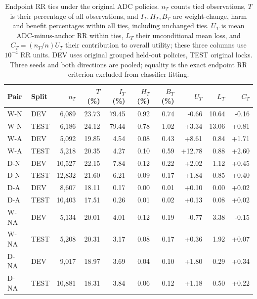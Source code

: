 \begin{table}[htbp]
\centering\footnotesize\setlength{\tabcolsep}{3pt}
\caption{Endpoint RR ties under the original ADC policies. $n_T$ counts tied observations, $T$ is their percentage of all observations, and $I_T,H_T,B_T$ are weight-change, harm and benefit percentages within all ties, including unchanged ties. $U_T$ is mean ADC-minus-anchor RR within ties, $L_T$ their unconditional mean loss, and $C_T=(n_T/n)U_T$ their contribution to overall utility; these three columns use $10^{-4}$ RR units. DEV uses original grouped held-out policies, TEST original locks. Three seeds and both directions are pooled; equality is the exact endpoint RR criterion excluded from classifier fitting.}
\label{tab:ties-pooled}
\begin{tabular}{llrrrrrrrr}
\toprule
Pair & Split & $n_T$ & $T$ (\%) & $I_T$ (\%) & $H_T$ (\%) & $B_T$ (\%) & $U_T$ & $L_T$ & $C_T$\\
\midrule
W-N & DEV & 6,089 & 23.73 & 79.45 & 0.92 & 0.74 & -0.66 & 10.64 & -0.16\\
W-N & TEST & 6,186 & 24.12 & 79.44 & 0.78 & 1.02 & +3.34 & 13.06 & +0.81\\
W-A & DEV & 5,092 & 19.85 & 4.54 & 0.08 & 0.43 & +8.61 & 0.84 & +1.71\\
W-A & TEST & 5,218 & 20.35 & 4.27 & 0.10 & 0.59 & +12.78 & 0.88 & +2.60\\
D-N & DEV & 10,527 & 22.15 & 7.84 & 0.12 & 0.22 & +2.02 & 1.12 & +0.45\\
D-N & TEST & 12,832 & 21.60 & 6.21 & 0.09 & 0.17 & +1.84 & 0.85 & +0.40\\
D-A & DEV & 8,607 & 18.11 & 0.17 & 0.00 & 0.01 & +0.10 & 0.00 & +0.02\\
D-A & TEST & 10,403 & 17.51 & 0.26 & 0.01 & 0.02 & +0.13 & 0.08 & +0.02\\
W-NA & DEV & 5,134 & 20.01 & 4.01 & 0.12 & 0.19 & -0.77 & 3.38 & -0.15\\
W-NA & TEST & 5,208 & 20.31 & 3.17 & 0.08 & 0.17 & +0.36 & 1.92 & +0.07\\
D-NA & DEV & 9,017 & 18.97 & 3.69 & 0.04 & 0.10 & +1.80 & 0.29 & +0.34\\
D-NA & TEST & 10,881 & 18.31 & 3.84 & 0.06 & 0.12 & +1.18 & 0.50 & +0.22\\
\bottomrule
\end{tabular}
\end{table}
